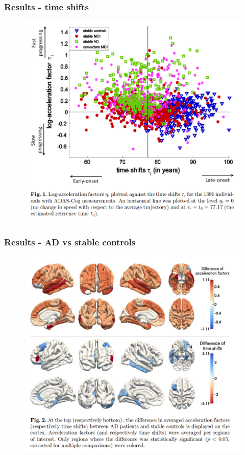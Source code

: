 \documentclass[10pt,xcolor=table]{beamer}
\begin{document}
\begin{frame}
\frametitle{Results - time shifts}

\begin{figure}
\includegraphics[scale=0.27]{res_fig1.png}
\end{figure}

\end{frame}

\begin{frame}
\frametitle{Results - AD vs stable controls}

\begin{figure}
\includegraphics[scale=0.27]{res_fig2.png}
\end{figure}

\end{frame}
\end{document}
